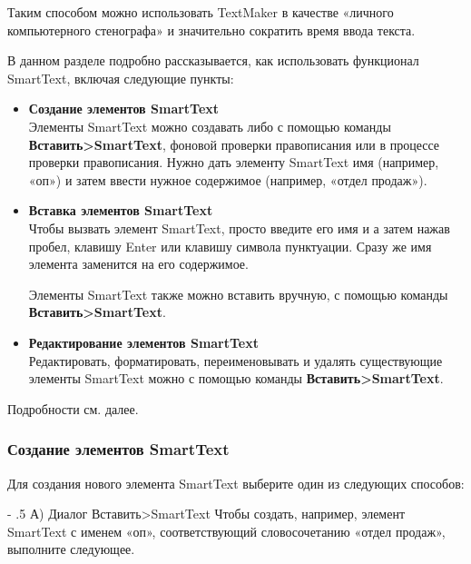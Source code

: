 ﻿\documentclass[a4paper,10pt]{article}
\makeatletter
\renewcommand\paragraph{%
   \@startsection{paragraph}{4}{0mm}%
      {-\baselineskip}%
      {.5\baselineskip}%
      {\normalfont\normalsize\bfseries}}
\makeatother
\begin{document}
Таким способом можно использовать TextMaker в качестве «личного компьютерного стенографа» и значительно сократить время ввода текста.

В данном разделе подробно рассказывается, как использовать функционал SmartText, включая следующие пункты:

\begin{itemize}
 \item \textbf{Создание элементов SmartText}\\
 Элементы SmartText можно создавать либо с помощью команды \textbf{Вставить>SmartText}, фоновой проверки правописания или в процессе проверки правописания. Нужно дать элементу SmartText имя (например, «оп») и затем ввести нужное содержимое (например, «отдел продаж»).
 \item \textbf{Вставка элементов SmartText}\\
 Чтобы вызвать элемент SmartText, просто введите его имя и а затем нажав пробел, клавишу Enter или клавишу символа пунктуации. Сразу же имя элемента заменится на его содержимое.
 
 Элементы SmartText также можно вставить вручную, с помощью команды \textbf{Вставить>SmartText}.
 \item \textbf{Редактирование элементов SmartText}\\
 Редактировать, форматировать, переименовывать и удалять существующие элементы SmartText можно с помощью команды \textbf{Вставить>SmartText}.
\end{itemize}

Подробности см. далее.

\subsubsection{Создание элементов SmartText}
Для создания нового элемента SmartText выберите один из следующих способов:

\paragraph{А) Диалог Вставить>SmartText}
Чтобы создать, например, элемент SmartText с именем «оп», соответствующий словосочетанию «отдел продаж», выполните следующее.
\end{document}
